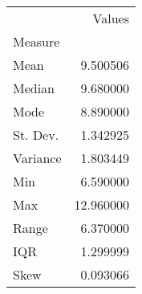 \begin{tabu}{lr}
\toprule
 & Values \\
Measure &  \\
\midrule
Mean & 9.500506 \\
Median & 9.680000 \\
Mode & 8.890000 \\
St. Dev. & 1.342925 \\
Variance & 1.803449 \\
Min & 6.590000 \\
Max & 12.960000 \\
Range & 6.370000 \\
IQR & 1.299999 \\
Skew & 0.093066 \\
\bottomrule
\end{tabu}